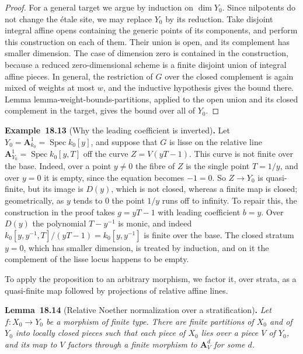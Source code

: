 \documentclass[11pt]{article}
\newenvironment{bpstatement}[2]{\par\addvspace{0.6\baselineskip}\noindent\textbf{#1}#2\textbf{.}\enspace\ignorespaces}
  {\par\addvspace{0.4\baselineskip}}
\newenvironment{bpstatementit}[2]{\begin{bpstatement}{#1}{#2}\itshape\ignorespaces}{\end{bpstatement}}
\begin{document}
\begin{proof}[{Proof}]
For a general target we argue by induction on \(\dim Y_0\). Since nilpotents do not change the étale site, we may replace \(Y_0\) by its reduction. Take disjoint integral affine opens containing the generic points of its components, and perform this construction on each of them. Their union is open, and its complement has smaller dimension. The case of dimension zero is contained in the construction, because a reduced zero-dimensional scheme is a finite disjoint union of integral affine pieces. In general, the restriction of \(G\) over the closed complement is again mixed of weights at most \(w\), and the inductive hypothesis gives the bound there. Lemma lemma-weight-bounds-partitions, applied to the open union and its closed complement in the target, gives the bound over all of \(Y_0\).
\end{proof}

\label{bp40}%
\begin{bpstatement}{Example~18.13}{ (Why the leading coefficient is inverted)}
Let \(Y_0=\mathbf A^1_{k_0}=\operatorname{Spec}k_0[y]\), and suppose that \(G\) is lisse on the relative line \(\mathbf A^1_{Y_0}=\operatorname{Spec}k_0[y,T]\) off the curve \(Z=V(yT-1)\). This curve is not finite over the base. Indeed, over a point \(y\ne0\) the fibre of \(Z\) is the single point \(T=1/y\), and over \(y=0\) it is empty, since the equation becomes \(-1=0\). So \(Z\to Y_0\) is quasi-finite, but its image is \(D(y)\), which is not closed, whereas a finite map is closed; geometrically, as \(y\) tends to \(0\) the point \(1/y\) runs off to infinity. To repair this, the construction in the proof takes \(g=yT-1\) with leading coefficient \(b=y\). Over \(D(y)\) the polynomial \(T-y^{-1}\) is monic, and indeed \(k_0[y,y^{-1},T]/(yT-1)=k_0[y,y^{-1}]\) is finite over the base. The closed stratum \(y=0\), which has smaller dimension, is treated by induction, and on it the complement of the lisse locus happens to be empty.
\end{bpstatement}

\label{bp41}%
To apply the proposition to an arbitrary morphism, we factor it, over strata, as a quasi-finite map followed by projections of relative affine lines.

\label{bp42}%
\begin{bpstatementit}{Lemma~18.14}{ (Relative Noether normalization over a stratification)}
Let \(f:X_0\to Y_0\) be a morphism of finite type. There are finite partitions of \(X_0\) and of \(Y_0\) into locally closed pieces such that each piece of \(X_0\) lies over a piece \(V\) of \(Y_0\), and its map to \(V\) factors through a finite morphism to \(\mathbf A^d_V\) for some \(d\).
\end{bpstatementit}
\end{document}
